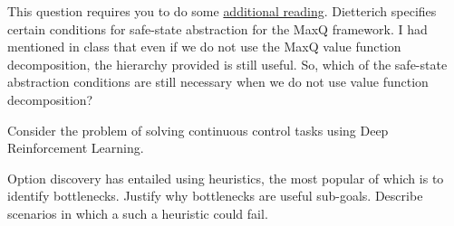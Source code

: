 \documentclass[solution,addpoints,12pt]{exam}
\begin{document}
\begin{questions}
\begin{solution}
\end{solution}


\question[4]
This question requires you to do some \href{https://arxiv.org/abs/cs/9905014}{additional reading}.  Dietterich specifies certain conditions for safe-state abstraction for the MaxQ framework.  I had mentioned in class that even if we do not use the MaxQ value function decomposition, the hierarchy provided is still useful.  So, which of the safe-state abstraction conditions are still necessary when we do not use value function decomposition?
\begin{solution}

\end{solution}

\question[3] Consider the problem of solving continuous control tasks using Deep Reinforcement Learning.



\question[3] Option discovery has entailed using heuristics, the most popular of which is to identify bottlenecks. Justify why bottlenecks are useful sub-goals. Describe scenarios in which a such a heuristic could fail.
\begin{solution}

\end{solution}

\end{questions}
\end{document}
